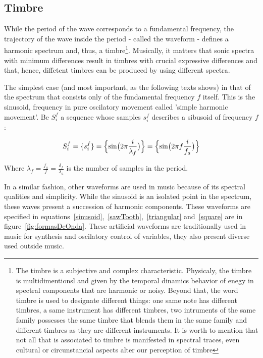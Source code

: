 \documentclass[
 aip,
 jmp,
 amsmath,amssymb,
 reprint,
]{revtex4-1}
\begin{document}
\subsection{Timbre}
While the period of the wave corresponds to a fundamental frequency, the trajectory of the wave inside the period - called the waveform - defines a harmonic spectrum and, thus, a timbre\footnote{The timbre is a subjective and complex characteristic. Physicaly, the timbre is multidimentionsl and given by the temporal dinamics behavior of enegy in spectral components that are harmonic or noisy. Beyond that, the word timbre is used to designate different things: one same note has different timbres, a same instrument has different timbres, two intruments of the same family possesses the same timbre that blends them in the same family and different timbres as they are different instruments. It is worth to mention that not all that is associated to timbre is manifested in spectral traces, even cultural or circunstancial aspects alter our perception of timbre}. Musically, it matters that sonic spectra with minimum differences result in timbres with crucial expressive differences and that, hence, diffetent timbres can be produced by using different spectra\cite{Roederer}.

The simplest case (and most important, as the following texts shows) in that of the spectrum that consists only of the fundamental frequency $f$ itself. This is the sinusoid, frequency in pure oscilatory movement called 'simple harmonic movement'. Be $S_i^f$ a sequence whose samples $s_i^f$ describes a sibusoid of frequency $f$:

\begin{equation}\label{senoide}
     S^f_i=\{ s^f_i \}=\Bigl\{ \sin\bigl(2\pi \frac{i}{\lambda_f} \bigr)  \Bigr\} = \Bigl\{ \sin\bigl(2\pi f \frac{i}{f_a}\bigr)  \Bigr\} 
\end{equation}

Where $\lambda_f=\frac{f_a}{f}=\frac{\delta_f}{\lambda_a}$  is the number of samples in the period.

In a similar fashion, other waveforms are used in music because of its spectral qualities and simplicity. While the sinusoid is an isolated point in the spectrum, these waves present a succession of harmonic components. These waveforms are specified in equations~\ref{sinusoid},~\ref{sawTooth},~\ref{triangular} and~\ref{square} are in figure~\ref{fig:formasDeOnda}.
These artificial waveforms are traditionally used in music for synthesis and oscilatory control of variables, they also present diverse used outside music\cite{Openheim}.
\end{document}

